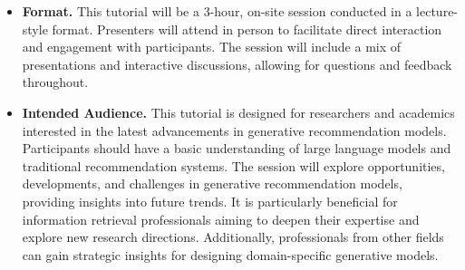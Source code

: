 \begin{itemize}[left=0pt]
    \item \textbf{Format.} This tutorial will be a 3-hour, on-site session conducted in a lecture-style format. Presenters will attend in person to facilitate direct interaction and engagement with participants. The session will include a mix of presentations and interactive discussions, allowing for questions and feedback throughout.

    \item \textbf{Intended Audience.} This tutorial is designed for researchers and academics interested in the latest advancements in generative recommendation models. Participants should have a basic understanding of large language models and traditional recommendation systems. The session will explore opportunities, developments, and challenges in generative recommendation models, providing insights into future trends. It is particularly beneficial for information retrieval professionals aiming to deepen their expertise and explore new research directions. Additionally, professionals from other fields can gain strategic insights for designing domain-specific generative models.
\end{itemize}